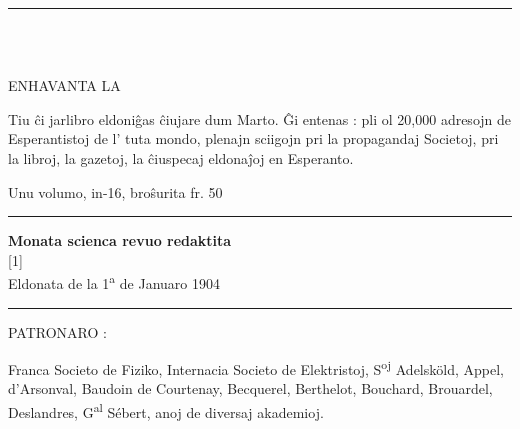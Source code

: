 %
%
\thispagestyle{plain}
{\centering
{\footnotesize {}\par}
\rule[0.9ex]{\textwidth}{0.4pt}

\\[1ex]
\parbox{0.7\textwidth}{}\\[1ex]
{\footnotesize ENHAVANTA LA}\par

{\par}
}

{\footnotesize Tiu ĉi jarlibro eldoniĝas ĉiujare dum Marto.  Ĝi entenas : pli ol 20,000 adresojn de Esperantistoj de l’ tuta mondo, plenajn sciigojn pri la propagandaj Societoj, pri la libroj, la gazetoj, la ĉiuspecaj eldonaĵoj en Esperanto.}

\newlength{\tempindent}
\setlength{\tempindent}{\parindent}
\setlength{\parindent}{0pt}
{\footnotesize Unu volumo, in-16, broŝurita  fr. 50}
\setlength{\parindent}{\tempindent}

{\centering
\rule[0.9ex]{\textwidth}{0.4pt}
{}

\vspace{1em}

{}

\vspace{1em}

{\small \bf Monata scienca revuo redaktita} \\
\scalebox{1.5}[1]{} \\
{\large Eldonata de la 1\textsuperscript{a} de Januaro 1904}

\rule[0.9ex]{13mm}{0.4pt}

{\footnotesize PATRONARO :\par}
}

{\footnotesize Franca Societo de Fiziko, Internacia Societo de Elektristoj, S\textsuperscript{oj} Adelsköld, Appel, d’Arsonval, Baudoin de Courtenay, Becquerel, Berthelot, Bouchard, Brouardel, Deslandres, G\textsuperscript{al} Sébert, anoj de diversaj akademioj.}

